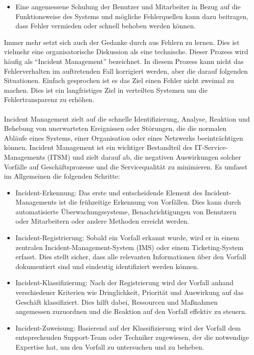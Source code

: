 \begin{itemize}
\begin{itemize}
\item Eine angemessene Schulung der Benutzer und Mitarbeiter in Bezug auf die Funktionsweise des Systems und mögliche Fehlerquellen kann dazu beitragen, dass Fehler vermieden oder schnell behoben werden können.
\end{itemize}
Immer mehr setzt sich auch der Gedanke durch aus Fehlern zu lernen. Dies ist vielmehr eine organisatorische Diskussion als eine technische. Dieser Prozess wird häufig als \enquote{Incident Management} bezeichnet. In diesem Prozess kann nicht das Fehlerverhalten im auftretenden Fall korrigiert werden, aber die darauf folgenden Situationen. Einfach gesprochen ist es das Ziel einen Fehler nicht zweimal zu machen. Dies ist ein langfristiges Ziel in verteilten Systemen um die Fehlertransparenz zu erhöhen. 
\\\\
Incident Management zielt auf die schnelle Identifizierung, Analyse, Reaktion und Behebung von unerwarteten Ereignissen oder Störungen, die die normalen Abläufe eines Systems, einer Organisation oder eines Netzwerks beeinträchtigen können. Incident Management ist ein wichtiger Bestandteil des IT-Service-Managements (ITSM) und zielt darauf ab, die negativen Auswirkungen solcher Vorfälle auf Geschäftsprozesse und die Servicequalität zu minimieren. Es umfasst im Allgemeinen die folgenden Schritte:
\begin{itemize}
\item Incident-Erkennung: Das erste und entscheidende Element des Incident-Managements ist die frühzeitige Erkennung von Vorfällen. Dies kann durch automatisierte Überwachungssysteme, Benachrichtigungen von Benutzern oder Mitarbeitern oder andere Methoden erreicht werden.
\item Incident-Registrierung: Sobald ein Vorfall erkannt wurde, wird er in einem zentralen Incident-Management-System (IMS) oder einem Ticketing-System erfasst. Dies stellt sicher, dass alle relevanten Informationen über den Vorfall dokumentiert sind und eindeutig identifiziert werden können.
\item Incident-Klassifizierung: Nach der Registrierung wird der Vorfall anhand verschiedener Kriterien wie Dringlichkeit, Priorität und Auswirkung auf das Geschäft klassifiziert. Dies hilft dabei, Ressourcen und Maßnahmen angemessen zuzuordnen und die Reaktion auf den Vorfall effektiv zu steuern.
\item Incident-Zuweisung: Basierend auf der Klassifizierung wird der Vorfall dem entsprechenden Support-Team oder Techniker zugewiesen, der die notwendige Expertise hat, um den Vorfall zu untersuchen und zu beheben.

\end{itemize}
\end{itemize}
